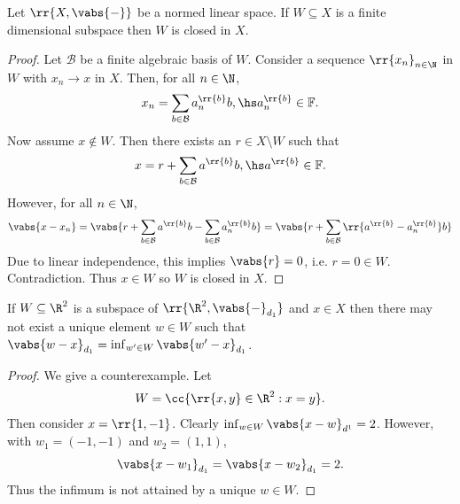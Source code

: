 \documentclass{article}
\begin{document}
\begin{claim*}[3]
  Let $\rr{X,\vabs{-}}$ be a normed linear space. If $W\subseteq X$ is a finite dimensional
  subspace then $W$ is closed in $X$.
  \begin{proof}
    Let $\mathcal B$ be a finite algebraic basis of $W$.
    Consider a sequence $\rr{x_n}_{n\in\N}$ in $W$ with $x_n\to x$ in $X$. Then, for all $n\in\N$,
    \begin{align*}
      x_n = \sum_{b\in\mathcal B} a^{\rr{b}}_n b, \hs a^{\rr{b}}_n \in \mathbb F.
    \end{align*}
    Now assume $x\not\in W$. Then there exists an $r\in X\setminus W$ such that
    \begin{align*}
      x = r + \sum_{b\in\mathcal B} a^{\rr{b}} b, \hs a^{\rr{b}} \in \mathbb F.
    \end{align*}
    However, for all $n\in\N$,
    \begin{align*}
      \vabs{x-x_n}=\vabs{r + \sum_{b\in\mathcal B} a^{\rr{b}} b - \sum_{b\in\mathcal B} a^{\rr{b}}_n b}
      = \vabs{r + \sum_{b\in\mathcal B} \rr{a^{\rr{b}}-a^{\rr{b}}_n} b}
    \end{align*}
    Due to linear independence, this implies $\vabs{r}=0$, i.e. $r=0\in W$.
    Contradiction. Thus $x\in W$ so $W$ is closed in $X$.
  \end{proof}
\end{claim*}

\begin{claim*}[6c]
  If $W\subseteq\R^2$ is a subspace of $\rr{\R^2,\vabs{-}_{d_1}}$ and $x\in X$ then there
  may not exist a unique element $w\in W$ such that $\vabs{w-x}_{d_1}=\inf_{w'\in W}\vabs{w'-x}_{d_1}$.
  \begin{proof}
    We give a counterexample. Let
    \begin{align*}
      W=\cc{\rr{x,y}\in\R^2:x=y}.
    \end{align*}
    Then consider $x=\rr{1,-1}$. Clearly $\inf_{w\in W}\vabs{x-w}_{d^1}=2$. However,
    with $w_1=(-1,-1)$ and $w_2=(1,1)$,
    \begin{align*}
      \vabs{x-w_1}_{d_1}=\vabs{x-w_2}_{d_1}=2.
    \end{align*}
    Thus the infimum is not attained by a unique $w\in W$.
  \end{proof}
\end{claim*}
\end{document}
